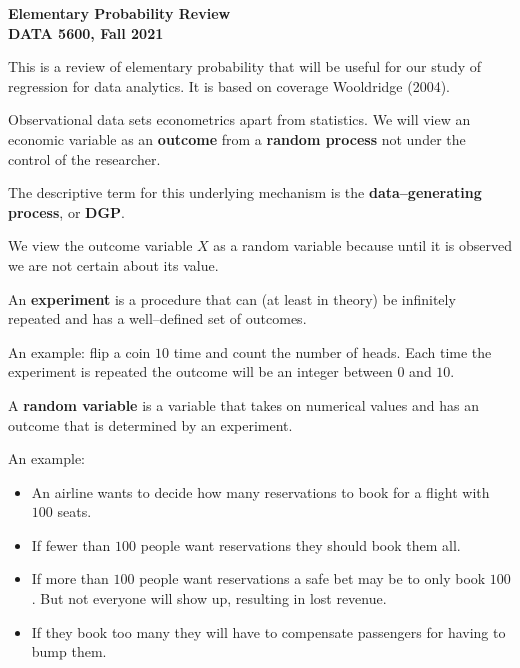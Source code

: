 \documentclass[11pt]{article}
\begin{document}
\pagestyle{empty}

\textbf{Elementary Probability Review} \\
\textbf{DATA 5600, Fall 2021} \\
\vspace{3.5mm}


This is a review of elementary probability that will be useful for our study of regression for data analytics. It is based on coverage Wooldridge (2004).

\vspace{3.5mm}

Observational data sets econometrics apart from statistics.  We will view an economic variable as an \textbf{outcome}
from a \textbf{random process} not under the control of the researcher.

\vspace{2mm}

The descriptive term for this underlying mechanism is the \textbf{data--generating process}, or \textbf{DGP}.

\vspace{2mm}

We view the outcome variable $X$ as a random variable because until it is observed we are not certain about its value.

\vspace{2mm}

An \textbf{experiment} is a procedure that can (at least in theory) be infinitely repeated and has a well--defined set 
of outcomes.

\vspace{2mm}
An example: flip a coin $10$ time and count the number of heads. Each time the experiment is repeated the outcome will 
be an integer between $0$ and $10$.

\vspace{2mm}

A \textbf{random variable} is a variable that takes on numerical values and has an outcome that is determined by an experiment.
\vspace{2mm}

An example: 

\begin{itemize}
 \item An airline wants to decide how many reservations to book for a flight with $100$ seats.
 \item If fewer than $100$ people want reservations they should book them all.
 \item If more than $100$ people want reservations a safe bet may be to only book $100$. But not everyone will show up, resulting
       in lost revenue.
 \item If they book too many they will have to compensate passengers for having to bump them.
\end{itemize}
\end{document}
